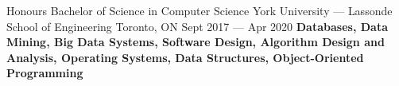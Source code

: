 

\begin{cventries}

  
  \cventryedu
    {Honours Bachelor of Science in Computer Science} %
    {York University — Lassonde School of Engineering} %
    {Toronto, ON} %
    {Sept 2017 — Apr 2020} %
    {\textbf{Databases, Data Mining, Big Data Systems, Software Design, Algorithm Design and Analysis, Operating Systems, Data Structures, Object-Oriented Programming}}
    
  

\end{cventries}
